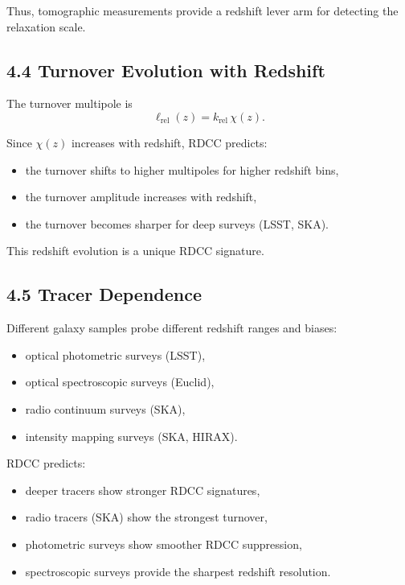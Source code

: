 \documentclass[11pt,a4paper]{article}
\begin{document}
Thus, tomographic measurements provide a redshift lever arm for detecting the relaxation 
scale.

\subsection*{4.4 Turnover Evolution with Redshift}

The turnover multipole is
\begin{equation}
    \ell_{\mathrm{rel}}(z)
    = k_{\mathrm{rel}}\,\chi(z).
\end{equation}

Since $\chi(z)$ increases with redshift, RDCC predicts:

\begin{itemize}
    \item the turnover shifts to higher multipoles for higher redshift bins,
    \item the turnover amplitude increases with redshift,
    \item the turnover becomes sharper for deep surveys (LSST, SKA).
\end{itemize}

This redshift evolution is a unique RDCC signature.

\subsection*{4.5 Tracer Dependence}

Different galaxy samples probe different redshift ranges and biases:

\begin{itemize}
    \item optical photometric surveys (LSST),
    \item optical spectroscopic surveys (Euclid),
    \item radio continuum surveys (SKA),
    \item intensity mapping surveys (SKA, HIRAX).
\end{itemize}

RDCC predicts:

\begin{itemize}
    \item deeper tracers show stronger RDCC signatures,
    \item radio tracers (SKA) show the strongest turnover,
    \item photometric surveys show smoother RDCC suppression,
    \item spectroscopic surveys provide the sharpest redshift resolution.
\end{itemize}
\end{document}
